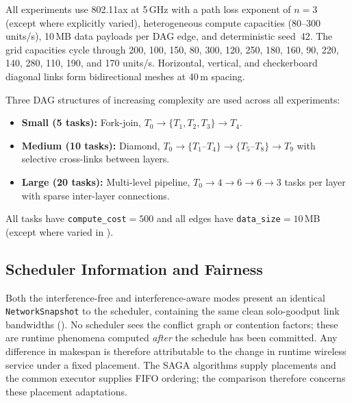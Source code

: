 \documentclass[conference]{IEEEtran}
\begin{document}
All experiments use 802.11ax at 5\,GHz with a path loss exponent of
$n = 3$ (except where explicitly varied), heterogeneous compute capacities
(80--300 units/s), 10\,MB data payloads per DAG edge, and deterministic
seed~42. The grid capacities cycle through 200, 100, 150, 80, 300, 120,
250, 180, 160, 90, 220, 140, 280, 110, 190, and 170 units/s. Horizontal,
vertical, and checkerboard diagonal links form bidirectional meshes at
40\,m spacing.

Three DAG structures of increasing complexity are used across all
experiments:
\begin{itemize}[itemsep=1pt,leftmargin=*]
\item \textbf{Small (5 tasks):} Fork-join, $T_0 \to \{T_1, T_2, T_3\}
  \to T_4$.
\item \textbf{Medium (10 tasks):} Diamond, $T_0 \to \{T_1\text{--}T_4\}
  \to \{T_5\text{--}T_8\} \to T_9$ with selective cross-links between
  layers.
\item \textbf{Large (20 tasks):} Multi-level pipeline, $T_0 \to 4 \to 6
  \to 6 \to 3$ tasks per layer with sparse inter-layer connections.
\end{itemize}
\noindent All tasks have \texttt{compute\_cost}${}= 500$ and all edges have
\texttt{data\_size}${}= 10$\,MB (except where varied in
).

\subsection{Scheduler Information and Fairness}
\label{sec:scheduler_info}

Both the interference-free and interference-aware modes present an
identical \texttt{NetworkSnapshot} to the scheduler, containing the same
clean solo-goodput link bandwidths ().  No scheduler
sees the conflict graph or contention factors; these are runtime phenomena
computed \emph{after} the schedule has been committed.  Any difference
in makespan is therefore attributable to the change in runtime wireless service under a fixed placement. The
SAGA algorithms supply placements and the common executor supplies FIFO
ordering; the comparison therefore concerns these placement adaptations.
\end{document}
